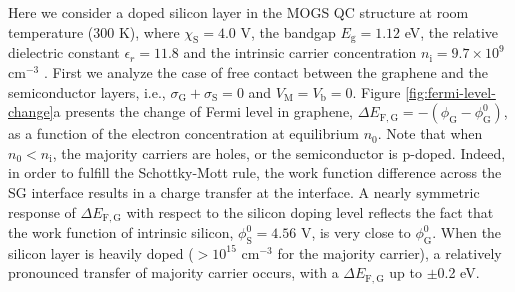 \documentclass[journal=nalefd]{achemso}
\newcommand*\subs[1]{_{\text{#1}}} %
\begin{document}
Here we consider a doped silicon layer in the MOGS QC structure at room temperature (300 K), where $\chi\subs{S} = 4.0$ V, the bandgap $E\subs{g} = 1.12$ eV, the relative dielectric constant $\epsilon_r = 11.8$ and the intrinsic carrier concentration $n\subs{i} = 9.7\times10^9$ cm$^{-3}$ \cite{Sproul1991Improved}.
First we analyze the case of free contact between the graphene and the semiconductor layers, i.e., $\sigma\subs{G}+\sigma\subs{S}=0$ and $V\subs{M}=V\subs{b}=0$.
Figure \ref{fig:fermi-level-change}a presents the change of Fermi level in graphene, $\Delta E_{\mathrm {F,G}} = -(\phi\subs{G} - \phi\subs{G}^0)$, as a function of the electron concentration at equilibrium $n_0$. 
Note that when $n_0 < n\subs{i}$, the majority carriers are holes, or the semiconductor is p-doped.
Indeed, in order to fulfill the Schottky-Mott rule, the work function difference across the SG interface results in a charge transfer at the interface. 
A nearly symmetric response of $\Delta E_{\mathrm {F,G}}$ with respect to the silicon doping level reflects the fact that the work function of intrinsic silicon, $\phi\subs{S}^0=4.56$ V, is very close to $\phi\subs{G}^0$.
When the silicon layer is heavily doped ($>10^{15}$  cm$^{−3}$  for the majority carrier), a relatively pronounced transfer of majority carrier occurs, with a $\Delta E_{\mathrm {F,G}}$ up to $\pm$0.2 eV. 
\end{document}
